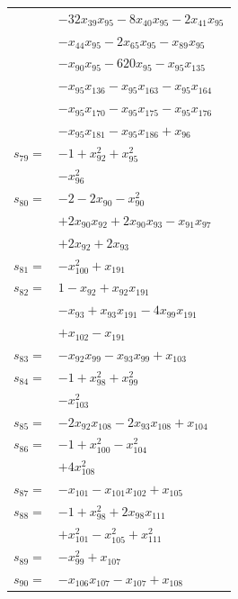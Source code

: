 \begin{longtable}{@{}r@{\;}l@{}}
 & \(\displaystyle -32x_{39}x_{95} -8x_{40}x_{95} -2x_{41}x_{95}\) \\
 & \(\displaystyle -x_{44}x_{95} -2x_{65}x_{95} -x_{89}x_{95}\) \\
 & \(\displaystyle -x_{90}x_{95} -620x_{95} -x_{95}x_{135}\) \\
 & \(\displaystyle -x_{95}x_{136} -x_{95}x_{163} -x_{95}x_{164}\) \\
 & \(\displaystyle -x_{95}x_{170} -x_{95}x_{175} -x_{95}x_{176}\) \\
 & \(\displaystyle -x_{95}x_{181} -x_{95}x_{186} +x_{96}\) \\[3pt]
\(s_{79}=\) & \(\displaystyle -1 +x_{92}^{2} +x_{95}^{2}\) \\
 & \(\displaystyle -x_{96}^{2}\) \\[3pt]
\(s_{80}=\) & \(\displaystyle -2 -2x_{90} -x_{90}^{2}\) \\
 & \(\displaystyle +2x_{90}x_{92} +2x_{90}x_{93} -x_{91}x_{97}\) \\
 & \(\displaystyle +2x_{92} +2x_{93}\) \\[3pt]
\(s_{81}=\) & \(\displaystyle -x_{100}^{2} +x_{191}\) \\[3pt]
\(s_{82}=\) & \(\displaystyle 1 -x_{92} +x_{92}x_{191}\) \\
 & \(\displaystyle -x_{93} +x_{93}x_{191} -4x_{99}x_{191}\) \\
 & \(\displaystyle +x_{102} -x_{191}\) \\[3pt]
\(s_{83}=\) & \(\displaystyle -x_{92}x_{99} -x_{93}x_{99} +x_{103}\) \\[3pt]
\(s_{84}=\) & \(\displaystyle -1 +x_{98}^{2} +x_{99}^{2}\) \\
 & \(\displaystyle -x_{103}^{2}\) \\[3pt]
\(s_{85}=\) & \(\displaystyle -2x_{92}x_{108} -2x_{93}x_{108} +x_{104}\) \\[3pt]
\(s_{86}=\) & \(\displaystyle -1 +x_{100}^{2} -x_{104}^{2}\) \\
 & \(\displaystyle +4x_{108}^{2}\) \\[3pt]
\(s_{87}=\) & \(\displaystyle -x_{101} -x_{101}x_{102} +x_{105}\) \\[3pt]
\(s_{88}=\) & \(\displaystyle -1 +x_{98}^{2} +2x_{98}x_{111}\) \\
 & \(\displaystyle +x_{101}^{2} -x_{105}^{2} +x_{111}^{2}\) \\[3pt]
\(s_{89}=\) & \(\displaystyle -x_{99}^{2} +x_{107}\) \\[3pt]
\(s_{90}=\) & \(\displaystyle -x_{106}x_{107} -x_{107} +x_{108}\) \\[3pt]

\end{longtable}
